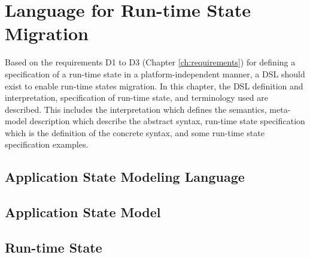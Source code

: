 \chapter{Language for Run-time State Migration}
\label{ch:language}
Based on the requirements D1 to D3 (Chapter \ref{ch:requirements}) for defining a specification of a run-time state in a platform-independent manner, a DSL should exist to enable run-time states migration.
In this chapter, the DSL definition and interpretation, specification of run-time state, and terminology used are described. This includes the interpretation which defines the semantics, meta-model description which describe the abstract syntax, run-time state specification which is the definition of the concrete syntax, and some run-time state specification examples.

\section{Application State Modeling Language}


\section{Application State Model}


\section{Run-time State}
